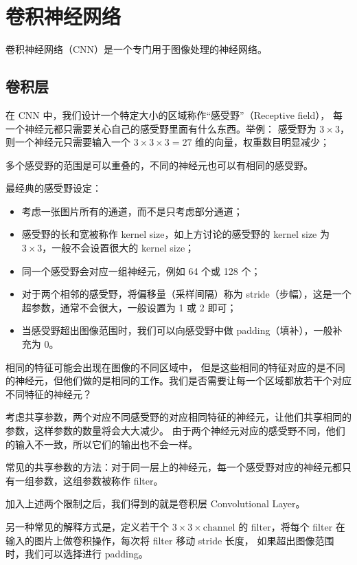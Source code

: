 \section{卷积神经网络}
卷积神经网络（CNN）是一个专门用于图像处理的神经网络。

\subsection{卷积层}

在 CNN 中，我们设计一个特定大小的区域称作“感受野”（Receptive field），
每一个神经元都只需要关心自己的感受野里面有什么东西。举例：
感受野为 $3\times3$，则一个神经元只需要输入一个 $3\times3\times3=27$ 维的向量，权重数目明显减少；

多个感受野的范围是可以重叠的，不同的神经元也可以有相同的感受野。

最经典的感受野设定：

\begin{itemize}
    \item 考虑一张图片所有的通道，而不是只考虑部分通道；
    \item 感受野的长和宽被称作 kernel size，如上方讨论的感受野的 kernel size 为 $3\times3$，一般不会设置很大的 kernel size；
    \item 同一个感受野会对应一组神经元，例如 64 个或 128 个；
    \item 对于两个相邻的感受野，将偏移量（采样间隔）称为 stride（步幅），这是一个超参数，通常不会很大，一般设置为 1 或 2 即可；
    \item 当感受野超出图像范围时，我们可以向感受野中做 padding（填补），一般补充为 0。
\end{itemize}

相同的特征可能会出现在图像的不同区域中，
但是这些相同的特征对应的是不同的神经元，但他们做的是相同的工作。我们是否需要让每一个区域都放若干个对应不同特征的神经元？

考虑共享参数，两个对应不同感受野的对应相同特征的神经元，让他们共享相同的参数，这样参数的数量将会大大减少。
由于两个神经元对应的感受野不同，他们的输入不一致，所以它们的输出也不会一样。

常见的共享参数的方法：对于同一层上的神经元，每一个感受野对应的神经元都只有一组参数，这组参数被称作 filter。

加入上述两个限制之后，我们得到的就是卷积层 Convolutional Layer。

另一种常见的解释方式是，定义若干个 $3 \times 3 \times \text{channel}$ 的 filter，将每个 filter 在输入的图片上做卷积操作，每次将 filter 移动 stride 长度，
如果超出图像范围时，我们可以选择进行 padding。

